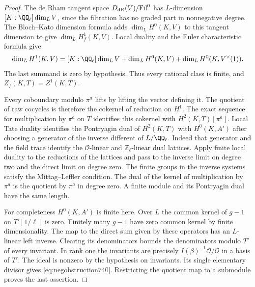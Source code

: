 \documentclass[a4paper,11pt]{article}
\theoremstyle{definition}
\theoremstyle{remark}
\newcommand{\ZZ}{\mathbb Z}\newcommand{\ord}{\operatorname{ord}}
\numberwithin{equation}{section}
\begin{document}
\begin{proof}
The de Rham tangent space \(D_{\rm dR}(V)/{\rm Fil}^0\) has
\(L\)-dimension \([K:\QQ_\ell]\dim_L V\), since the filtration
has no graded part in nonnegative degree. The Bloch--Kato
dimension formula adds \(\dim_L H^0(K,V)\) to this tangent
dimension to give \(\dim_L H^1_f(K,V)\). Local duality and the
Euler characteristic formula give
\[
 \dim_L H^1(K,V)=[K:\QQ_\ell]\dim_L V+\dim_L H^0(K,V)
                              +\dim_L H^0(K,V^\vee(1)).
\]
The last summand is zero by hypothesis. Thus every rational
class is finite, and \(Z_f(K,T)=Z^1(K,T)\).
\cite[Corollary~3.8.4 and the proof of (3.8.5)]{III-II-II-bktate717}

Every coboundary modulo \(\pi^a\) lifts by lifting the vector
defining it. The quotient of raw cocycles is therefore the
cokernel of reduction on \(H^1\). The exact sequence for
multiplication by \(\pi^a\) on \(T\) identifies this cokernel
with \(H^2(K,T)[\pi^a]\). Local Tate duality identifies the
Pontryagin dual of \(H^2(K,T)\) with \(H^0(K,A')\) after choosing
a generator of the inverse different of \(L/\QQ_\ell\).
Indeed that generator and the field trace identify the
\(\mathcal O\)-linear and \(\ZZ_\ell\)-linear dual lattices.
Apply finite local duality to the reductions of the lattices and
pass to the inverse limit on degree two and the direct limit on
degree zero. The finite groups in the inverse systems satisfy
the Mittag--Leffler condition. The dual of the kernel of
multiplication by \(\pi^a\) is the quotient by \(\pi^a\) in
degree zero. A finite module and its Pontryagin dual have the
same length. \cite[Chapter~I, \S2]{III-II-II-duality13}

For completeness \(H^0(K,A')\) is finite here. Over \(L\) the
common kernel of \(g-1\) on \(T'[1/\ell]\) is zero. Finitely
many \(g-1\) have zero common kernel by finite dimensionality.
The map to the direct sum given by these operators has an
\(L\)-linear left inverse. Clearing its denominators bounds the
denominators modulo \(T'\) of every invariant. In rank one the
invariants are precisely \(I(\beta)^{-1}\mathcal O/\mathcal O\)
in a basis of \(T'\). The ideal is nonzero by the hypothesis on
invariants. Its single elementary divisor gives
\eqref{eq:negobstruction740}. Restricting the quotient map to
a submodule proves the last assertion.
\end{proof}
\end{document}

